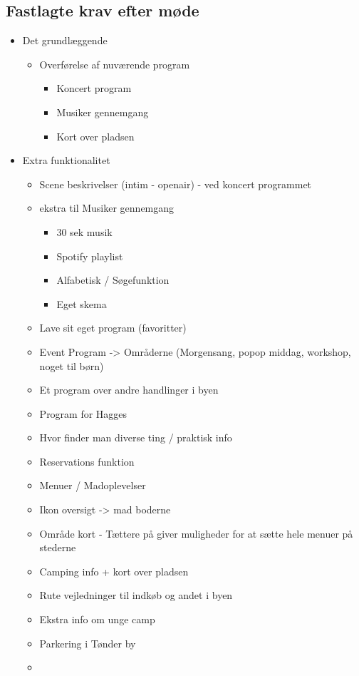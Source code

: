 \documentclass[a4paper,10pt,titlepage]{article}
\begin{document}
\subsection{Fastlagte krav efter møde}
\begin{itemize}
\item
Det grundlæggende
\begin{itemize}
\item
Overførelse af nuværende program
\begin{itemize}
\item
Koncert program
\item
Musiker gennemgang
\item
Kort over pladsen
\end{itemize}
\end{itemize}
\item
Extra funktionalitet
\begin{itemize}
\item
Scene beskrivelser (intim - openair) - ved koncert programmet
\item
ekstra til Musiker gennemgang
\begin{itemize}
\item
30 sek musik
\item
Spotify playlist
\item
Alfabetisk / Søgefunktion
\item
Eget skema
\end{itemize}
\item
Lave sit eget program (favoritter)
\item
Event Program -> Områderne (Morgensang, popop middag, workshop, noget til børn)
\item
Et program over andre handlinger i byen
\item
Program for Hagges
\item
Hvor finder man diverse ting / praktisk info
\item
Reservations funktion
\item
Menuer / Madoplevelser
\item
Ikon oversigt -> mad boderne
\item
Område kort - Tættere på giver muligheder for at sætte hele menuer på stederne
\item
Camping info + kort over pladsen
\item
Rute vejledninger til indkøb og andet i byen
\item
Ekstra info om unge camp
\item
Parkering i Tønder by
\item

\end{itemize}
\end{itemize}
\end{document}
